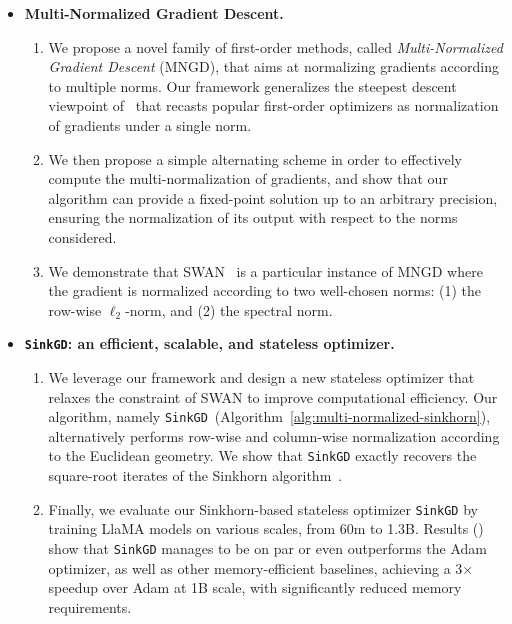 \begin{itemize}[leftmargin=1em]
    \item \textbf{Multi-Normalized Gradient Descent.} 
    \begin{enumerate}[leftmargin=1em]
         \item We propose a novel family of first-order  methods, called \emph{Multi-Normalized Gradient Descent} (MNGD), that aims at normalizing gradients according to multiple norms. Our framework generalizes the steepest descent viewpoint of~\cite{bernstein2024old} that recasts popular first-order optimizers as normalization of gradients under a single norm.
    
        \item We then propose a simple alternating scheme in order to effectively compute the multi-normalization of gradients, and show that our algorithm can provide a fixed-point solution up to an arbitrary precision, ensuring the normalization of its output with respect to the norms considered. 
        
        \item We demonstrate that SWAN~\cite{ma2024swansgdnormalizationwhitening} is a particular instance of MNGD where the gradient is normalized according to two well-chosen norms: (1) the row-wise $\ell_2$-norm, and (2) the spectral norm. 
    \end{enumerate}

    \item \textbf{\texttt{SinkGD}: an efficient, scalable, and stateless optimizer.}

    \begin{enumerate}[leftmargin=1em]
         \item We leverage our framework and design a new stateless optimizer that relaxes the constraint of SWAN to improve computational efficiency. Our algorithm, namely \texttt{SinkGD}~(Algorithm~\ref{alg:multi-normalized-sinkhorn}), alternatively performs row-wise and column-wise normalization according to the Euclidean geometry. We show that \texttt{SinkGD} exactly recovers the square-root iterates of the Sinkhorn algorithm~\cite{sinkhorn1964relationship}.

    \item Finally, we evaluate our Sinkhorn-based stateless optimizer \texttt{SinkGD} by training LlaMA models on various scales, from 60m to 1.3B. Results () show that \texttt{SinkGD} manages to be on par or even outperforms the Adam optimizer, as well as other memory-efficient baselines, achieving a $3$× speedup over Adam at 1B scale, with significantly reduced memory requirements.
    \end{enumerate}
    
    
   
\end{itemize}
